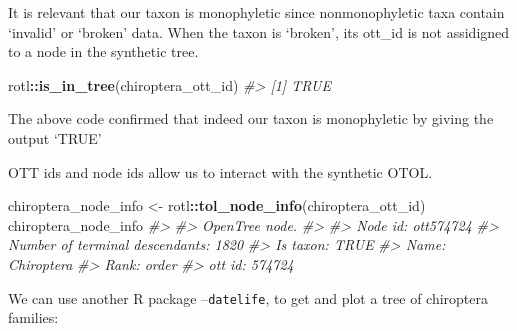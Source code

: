 \documentclass[]{article}
\newenvironment{Shaded}{\begin{snugshade}}{\end{snugshade}}
\newcommand{\CommentTok}[1]{\textcolor[rgb]{0.56,0.35,0.01}{\textit{#1}}}
\newcommand{\KeywordTok}[1]{\textcolor[rgb]{0.13,0.29,0.53}{\textbf{#1}}}
\newcommand{\NormalTok}[1]{#1}
\newcommand{\OperatorTok}[1]{\textcolor[rgb]{0.81,0.36,0.00}{\textbf{#1}}}
\newcommand{\StringTok}[1]{\textcolor[rgb]{0.31,0.60,0.02}{#1}}
\begin{document}
It is relevant that our taxon is monophyletic since nonmonophyletic taxa
contain `invalid' or `broken' data. When the taxon is `broken', its
ott\_id is not assidigned to a node in the synthetic tree.

\begin{Shaded}
\begin{Highlighting}[]
\NormalTok{rotl}\OperatorTok{::}\KeywordTok{is_in_tree}\NormalTok{(chiroptera_ott_id)}
\CommentTok{#> [1] TRUE}
\end{Highlighting}
\end{Shaded}

The above code confirmed that indeed our taxon is monophyletic by giving
the output `TRUE'

OTT ids and node ids allow us to interact with the synthetic OTOL.

\begin{Shaded}
\begin{Highlighting}[]
\NormalTok{chiroptera_node_info <-}\StringTok{ }\NormalTok{rotl}\OperatorTok{::}\KeywordTok{tol_node_info}\NormalTok{(chiroptera_ott_id)}
\NormalTok{chiroptera_node_info}
\CommentTok{#> }
\CommentTok{#> OpenTree node.}
\CommentTok{#> }
\CommentTok{#> Node id: ott574724}
\CommentTok{#> Number of terminal descendants: 1820}
\CommentTok{#> Is taxon: TRUE}
\CommentTok{#> Name: Chiroptera}
\CommentTok{#> Rank: order}
\CommentTok{#> ott id: 574724}
\end{Highlighting}
\end{Shaded}

We can use another R package --\texttt{datelife}, to get and plot a tree
of chiroptera families:
\end{document}

